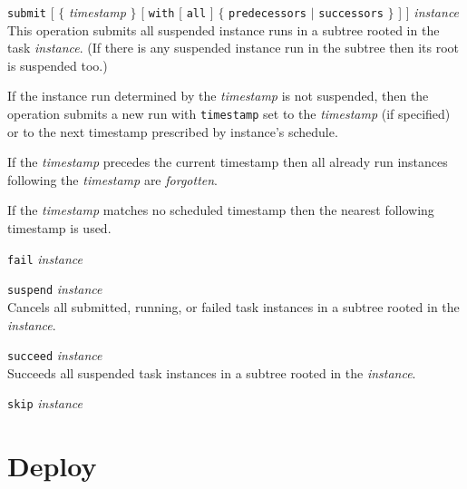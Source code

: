 \documentclass[a4paper,12pt,english,oneside]{book}
\begin{document}
%
\begin{labeling}[\quad]{}
%
\item[\texttt{submit} {[} $\{$ \emph{timestamp} $\}$ {[} \texttt{with} {[} \texttt{all} {]} $\{$ \texttt{predecessors} $\mid$ \texttt{successors} $\}$ {]} {]} \emph{instance}]\mbox{}\medskip\\
%
%
    This operation submits all suspended instance runs in a subtree rooted in the task \emph{instance}. (If there is any suspended instance run in the subtree then its root is suspended too.)
    
    If the instance run determined by the \emph{timestamp} is not suspended, then the operation submits a new run with \verb|timestamp| set to the \emph{timestamp} (if specified) or to the next timestamp prescribed by instance's schedule.
    
    If the \emph{timestamp} precedes the current timestamp then all already run instances following the \emph{timestamp} are \emph{forgotten}.
    
    If the \emph{timestamp} matches no scheduled timestamp then the nearest following timestamp is used.
%
\item[{\texttt{fail} \emph{instance}}]\mbox{}\medskip\\
%
\item[{\texttt{suspend} \emph{instance}}]\mbox{}\medskip\\
%
    Cancels all submitted, running, or failed task instances in a subtree rooted in the \emph{instance}.
%
\item[{\texttt{succeed} \emph{instance}}]\mbox{}\medskip\\
%
    Succeeds all suspended task instances in a subtree rooted in the \emph{instance}.
%
\item[{\texttt{skip} \emph{instance}}]\mbox{}\medskip\\
%
\end{labeling}

\section{Deploy}
\end{document}
